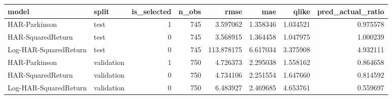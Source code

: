\begin{tabular}{l l r r r r r r}
\hline
model & split & is\_selected & n\_obs & rmse & mae & qlike & pred\_actual\_ratio \\
\hline
HAR-Parkinson & test & 1 & 745 & 3.597062 & 1.358346 & 1.034521 & 0.975578 \\
HAR-SquaredReturn & test & 0 & 745 & 3.568915 & 1.364458 & 1.047975 & 1.000239 \\
Log-HAR-SquaredReturn & test & 0 & 745 & 113.878175 & 6.617034 & 3.375908 & 4.932111 \\
HAR-Parkinson & validation & 1 & 750 & 4.726373 & 2.295038 & 1.558162 & 0.864658 \\
HAR-SquaredReturn & validation & 0 & 750 & 4.734106 & 2.251554 & 1.647660 & 0.814592 \\
Log-HAR-SquaredReturn & validation & 0 & 750 & 6.483927 & 2.469685 & 4.653761 & 0.559697 \\
\hline
\end{tabular}
